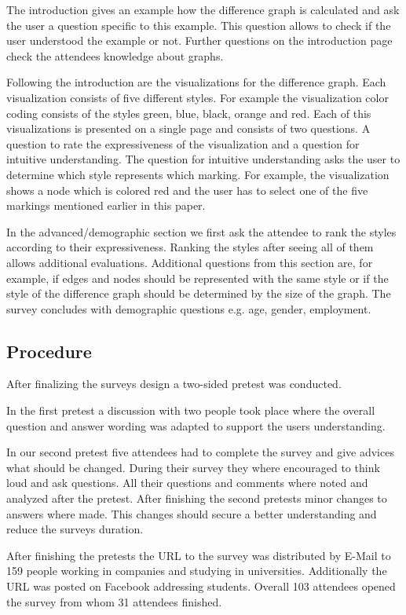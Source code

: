 \documentclass{llncs}
\begin{document}
The introduction gives an example how the difference graph is calculated and ask the user a question specific to this example. This question allows to check if the user understood the example or not. Further questions on the introduction page check the attendees knowledge about graphs.

Following the introduction are the visualizations for the difference graph. Each visualization consists of five different styles. For example the visualization color coding consists of the styles green, blue, black, orange and red. Each of this visualizations is presented on a single page and consists of two questions. A question to rate the expressiveness of the visualization and a question for intuitive understanding. The question for intuitive understanding asks the user to determine which style represents which marking. For example, the visualization shows a node which is colored red and the user has to select one of the five markings mentioned earlier in this paper.

In the advanced/demographic section we first ask the attendee to rank the styles according to their expressiveness. Ranking the styles after seeing all of them allows additional evaluations. Additional questions from this section are, for example, if edges and nodes should be represented with the same style or if the style of the difference graph should be determined by the size of the graph. The survey concludes with demographic questions e.g. age, gender, employment.


\subsection{Procedure} %
\label{sec:Procedure}
After finalizing the surveys design a two-sided pretest was conducted.

In the first pretest a discussion with two people took place where the overall question and answer wording was adapted to support the users understanding.

In our second pretest five attendees had to complete the survey and give advices what should be changed. During their survey they where encouraged to think loud and ask questions. All their questions and comments where noted and analyzed after the pretest. After finishing the second pretests minor changes to answers where made. This changes should secure a better understanding and reduce the surveys duration.

After finishing the pretests the URL to the survey was distributed by E-Mail to 159 people working in companies and studying in universities. Additionally the URL was posted on Facebook addressing students. Overall 103 attendees opened the survey from whom 31 attendees finished.
\end{document}
